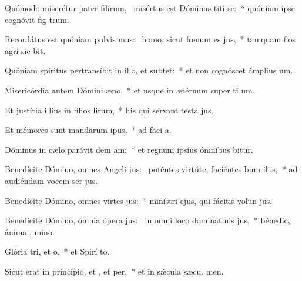 \item Quómodo miserétur pater filirum,~\pscross{} misértus est Dóminus titi se:~* quóniam ipse cognóvit fig trum.
\item Recordátus est quóniam pulvis mus:~\pscross{} homo, sicut fœnum es jus,~* tamquam flos agri sic bit.
\item Quóniam spíritus pertransíbit in illo, et  subtet:~* et non cognóscet ámplius  um.
\item Misericórdia autem Dómini  æno,~* et usque in ætérnum super ti um.
\item Et justítia illíus in fílios lirum,~* his qui servant testa jus.
\item Et mémores sunt mandarum ipus,~* ad faci a.
\item Dóminus in cælo parávit dem am:~* et regnum ipsíus ómnibus bitur.
\item Benedícite Dómino, omnes Angeli jus:~\pscross{} poténtes virtúte, faciéntes bum ilus,~* ad audiéndam vocem ser jus.
\item Benedícite Dómino, omnes virtes jus:~* minístri ejus, qui fácitis volun jus.
\item Benedícite Dómino, ómnia ópera jus:~\pscross{} in omni loco dominatinis jus,~* bénedic, ánima , mino.
\item Glória tri, et o,~* et Spirí to.
\item Sicut erat in princípio, et , et per,~* et in sǽcula sæcu. men.
